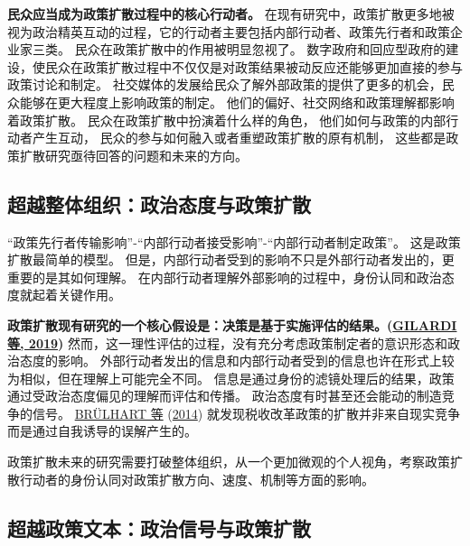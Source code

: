 \documentclass[
  12pt,
]{ctexart}
\begin{document}
\textbf{民众应当成为政策扩散过程中的核心行动者。}
在现有研究中，政策扩散更多地被视为政治精英互动的过程，它的行动者主要包括内部行动者、政策先行者和政策企业家三类。
民众在政策扩散中的作用被明显忽视了。
数字政府和回应型政府的建设，使民众在政策扩散过程中不仅仅是对政策结果被动反应还能够更加直接的参与政策讨论和制定。
社交媒体的发展给民众了解外部政策的提供了更多的机会，民众能够在更大程度上影响政策的制定。
他们的偏好、社交网络和政策理解都影响着政策扩散。
民众在政策扩散中扮演着什么样的角色，
他们如何与政策的内部行动者产生互动，
民众的参与如何融入或者重塑政策扩散的原有机制，
这些都是政策扩散研究亟待回答的问题和未来的方向。

\hypertarget{ux8d85ux8d8aux6574ux4f53ux7ec4ux7ec7ux653fux6cbbux6001ux5ea6ux4e0eux653fux7b56ux6269ux6563}{%
\subsection{超越整体组织：政治态度与政策扩散}\label{ux8d85ux8d8aux6574ux4f53ux7ec4ux7ec7ux653fux6cbbux6001ux5ea6ux4e0eux653fux7b56ux6269ux6563}}

``政策先行者传输影响''-``内部行动者接受影响''-``内部行动者制定政策''。
这是政策扩散最简单的模型。
但是，内部行动者受到的影响不只是外部行动者发出的，更重要的是其如何理解。
在内部行动者理解外部影响的过程中，身份认同和政治态度就起着关键作用。

\textbf{政策扩散现有研究的一个核心假设是：决策是基于实施评估的结果。(\protect\hyperlink{ref-GilardiWasserfallen2019}{GILARDI 等, 2019})}
然而，这一理性评估的过程，没有充分考虑政策制定者的意识形态和政治态度的影响。
外部行动者发出的信息和内部行动者受到的信息也许在形式上较为相似，但在理解上可能完全不同。
信息是通过身份的滤镜处理后的结果，政策通过受政治态度偏见的理解而评估和传播。
政治态度有时甚至还会能动的制造竞争的信号。 \protect\hyperlink{ref-BrulhartParchet2014}{BRÜLHART 等} (\protect\hyperlink{ref-BrulhartParchet2014}{2014}) 就发现税收改革政策的扩散并非来自现实竞争而是通过自我诱导的误解产生的。

政策扩散未来的研究需要打破整体组织，从一个更加微观的个人视角，考察政策扩散行动者的身份认同对政策扩散方向、速度、机制等方面的影响。

\hypertarget{ux8d85ux8d8aux653fux7b56ux6587ux672cux653fux6cbbux4fe1ux53f7ux4e0eux653fux7b56ux6269ux6563}{%
\subsection{超越政策文本：政治信号与政策扩散}\label{ux8d85ux8d8aux653fux7b56ux6587ux672cux653fux6cbbux4fe1ux53f7ux4e0eux653fux7b56ux6269ux6563}}
\end{document}
